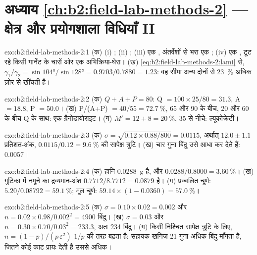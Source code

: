 \section*{अध्याय \ref{ch:b2:field-lab-methods-2} --- क्षेत्र और प्रयोगशाला विधियाँ II}

\begin{solution}{exo:b2:field-lab-methods-2:1}
(क) (i) ; (ii) ; (iii) एक , अंतर्वेशों से भरा एक
; (iv) एक , टूट रहे किसी गार्नेट के चारों ओर एक अभिक्रिया-घेरा। (ख)
\eqref{eq:b2:field-lab-methods-2:lami} से, $\gamma_1/\gamma_2 = \sin\ang{104}/\sin\ang{128} =
0.9703/0.7880 = 1.23$: वह सीमा अन्य दोनों से \qty{23}{\percent} अधिक ज़ोर से खींचती है।
\end{solution}

\begin{solution}{exo:b2:field-lab-methods-2:2}
(क) $Q + A + P = 80$: Q $= 100 \times 25/80 = 31.3$, A $= 18.8$, P $= 50.0$। (ख) P/(A+P) $=
40/55 = \qty{72.7}{\percent}$, 65 और 90 के बीच, 20 और 60 के बीच Q के साथ: एक ग्रैनोडायोराइट।
(ग) $M' = 12 + 8 = \qty{20}{\percent}$, 35 से नीचे: ल्यूकोक्रेटी।
\end{solution}

\begin{solution}{exo:b2:field-lab-methods-2:3}
(क) $\sigma = \sqrt{0.12 \times 0.88/800} = 0.0115$, अर्थात् $12.0 \pm 1.1$ प्रतिशत-अंक,
$0.0115/0.12 = \qty{9.6}{\percent}$ की सापेक्ष त्रुटि। (ख) चार गुना बिंदु उसे आधा कर देते हैं: $0.0057$।
\end{solution}

\begin{solution}{exo:b2:field-lab-methods-2:4}
(क) हानि \qty{0.0288}{g} है, और $0.0288/0.8000 = \qty{3.60}{\percent}$।
(ख) गुटिका में नमूने का द्रव्यमान-अंश $0.7712/8.7712 = 0.0879$ है।
(ग) प्रज्वलित चूर्ण: $5.20/0.08792 = \qty{59.1}{\percent}$; मूल चूर्ण:
$59.14 \times (1 - 0.0360) = \qty{57.0}{\percent}$।
\end{solution}

\begin{solution}{exo:b2:field-lab-methods-2:5}
(क) $\sigma = 0.10 \times 0.02 = 0.002$ और $n = 0.02 \times 0.98/0.002^2 = 4900$ बिंदु।
(ख) $\sigma = 0.03$ और $n = 0.30 \times 0.70/0.03^2 = 233.3$, अतः 234 बिंदु। (ग) किसी निश्चित सापेक्ष
त्रुटि के लिए, $n = (1-p)/(p\,\varepsilon^2)$ $1/p$ की तरह बढ़ता है: सहायक खनिज 21 गुना अधिक
बिंदु माँगता है, जितने कोई काट प्रायः देती है उससे अधिक।
\end{solution}

